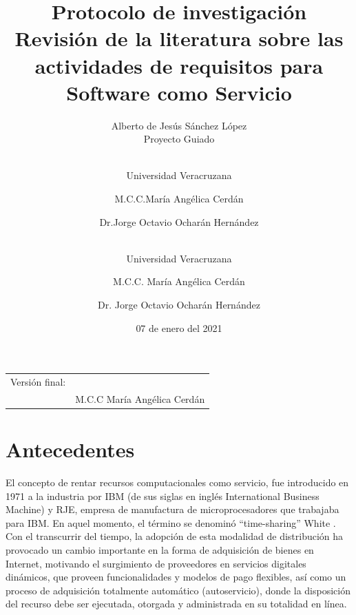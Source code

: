 \documentclass{article}
\begin{document}
  \title{%
  Protocolo de investigación\\

  \large Revisión de la literatura sobre las actividades de requisitos para Software como Servicio\\}
  \author{Alberto de Jesús Sánchez López \\ 
  \small Proyecto Guiado}
  \author{\\Universidad Veracruzana \and M.C.C.María Angélica Cerdán \and Dr.Jorge Octavio Ocharán Hernández}
  \author{\\Universidad Veracruzana\\ \and M.C.C. María Angélica Cerdán \and Dr. Jorge Octavio Ocharán Hernández}
  \date{07 de enero del 2021}
  \maketitle
  \hfill
  \begin{tabular}{@{}p{.5in}p{4in}@{}}
          Versión final: & \hrulefill \\
          & M.C.C María Angélica Cerdán \\
  \end{tabular}
  \thispagestyle{empty}
  \newpage

  \tableofcontents
  \thispagestyle{empty}
  \newpage

\setcounter{page}{1}
\section{Antecedentes}

El concepto de rentar recursos computacionales como servicio, fue introducido en 1971 a la industria por IBM (de sus siglas en inglés International Business Machine) y RJE, empresa de manufactura de microprocesadores que 
trabajaba para IBM. En aquel momento, el término se denominó “time-sharing” White \cite{antecedentes6}. Con el transcurrir del tiempo, la adopción de esta modalidad de distribución ha provocado un cambio importante en la forma 
de adquisición de bienes en Internet, motivando el surgimiento de proveedores en servicios digitales dinámicos, que proveen funcionalidades y modelos de pago flexibles, así como un proceso de adquisición totalmente 
automático (autoservicio), donde la disposición del recurso debe ser ejecutada, otorgada y administrada en su totalidad en línea.
\end{document}
